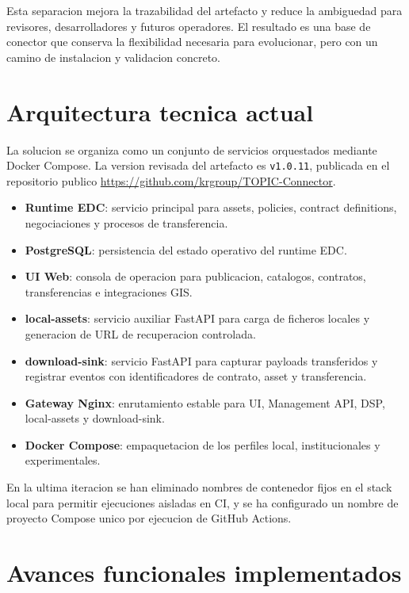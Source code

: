 \documentclass{article}
\begin{document}
Esta separacion mejora la trazabilidad del artefacto y reduce la ambiguedad para revisores, desarrolladores y futuros operadores. El resultado es una base de conector que conserva la flexibilidad necesaria para evolucionar, pero con un camino de instalacion y validacion concreto.

\section{Arquitectura tecnica actual}

La solucion se organiza como un conjunto de servicios orquestados mediante Docker Compose. La version revisada del artefacto es \texttt{v1.0.11}, publicada en el repositorio publico \url{https://github.com/krgroup/TOPIC-Connector}.

\begin{itemize}[leftmargin=1.2cm]
    \item \textbf{Runtime EDC}: servicio principal para assets, policies, contract definitions, negociaciones y procesos de transferencia.
    \item \textbf{PostgreSQL}: persistencia del estado operativo del runtime EDC.
    \item \textbf{UI Web}: consola de operacion para publicacion, catalogos, contratos, transferencias e integraciones GIS.
    \item \textbf{local-assets}: servicio auxiliar FastAPI para carga de ficheros locales y generacion de URL de recuperacion controlada.
    \item \textbf{download-sink}: servicio FastAPI para capturar payloads transferidos y registrar eventos con identificadores de contrato, asset y transferencia.
    \item \textbf{Gateway Nginx}: enrutamiento estable para UI, Management API, DSP, local-assets y download-sink.
    \item \textbf{Docker Compose}: empaquetacion de los perfiles local, institucionales y experimentales.
\end{itemize}

En la ultima iteracion se han eliminado nombres de contenedor fijos en el stack local para permitir ejecuciones aisladas en CI, y se ha configurado un nombre de proyecto Compose unico por ejecucion de GitHub Actions.

\section{Avances funcionales implementados}
\end{document}
